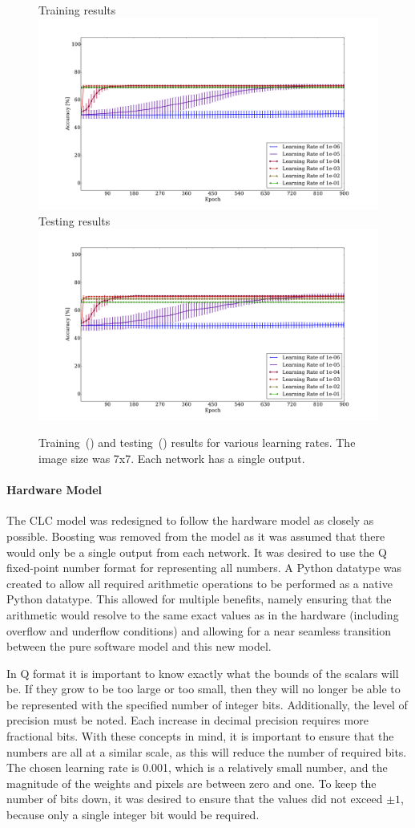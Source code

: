 \documentclass[10pt,journal]{IEEEtran}
\begin{document}
				\begin{figure}[t!]
					\captionsetup[subfigure]{position=b}
					\centering
					\hfill
					\subcaptionbox
					{
						Training results
						\label{fig:sw_learning_rate:training}
					}
					{\includegraphics[width=0.49\linewidth]{sw_learning_rate_training}}
					\hfill
					\subcaptionbox
					{
						Testing results
						\label{fig:sw_learning_rate:testing}
					}
					{\includegraphics[width=0.49\linewidth]{sw_learning_rate_testing}}
					\hfill
					\caption{Training~() and testing~() results for various learning rates. The image size was 7x7. Each network has a single output.}
					\label{fig:sw_learning_rate}
				\end{figure}
			
			\paragraph{Hardware Model}
				The CLC model was redesigned to follow the hardware model as closely as possible. Boosting was removed from the model as it was assumed that there would only be a single output from each network. It was desired to use the Q fixed-point number format for representing all numbers. A Python datatype was created to allow all required arithmetic operations to be performed as a native Python datatype. This allowed for multiple benefits, namely ensuring that the arithmetic would resolve to the same exact values as in the hardware (including overflow and underflow conditions) and allowing for a near seamless transition between the pure software model and this new model.
				
				In Q format it is important to know exactly what the bounds of the scalars will be. If they grow to be too large or too small, then they will no longer be able to be represented with the specified number of integer bits. Additionally, the level of precision must be noted. Each increase in decimal precision requires more fractional bits. With these concepts in mind, it is important to ensure that the numbers are all at a similar scale, as this will reduce the number of required bits. The chosen learning rate is 0.001, which is a relatively small number, and the magnitude of the weights and pixels are between zero and one. To keep the number of bits down, it was desired to ensure that the values did not exceed \(\pm{1}\), because only a single integer bit would be required.
				
\end{document}
